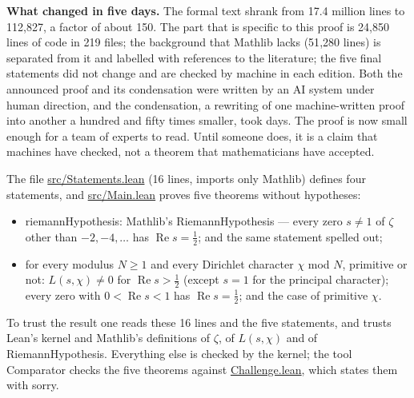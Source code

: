 \documentclass[11pt,a4paper]{article}
\newcommand{\code}[1]{{\ttfamily\small\color{lean}#1}}
\newcommand{\lk}[2]{\href{#1}{\code{#2}}}
\newcommand{\B}{https://github.com/lsernau/grh-lean/blob/72fead102f663d5c7a407964a13dc0cf9d977207/grh-compact/}
\newcommand{\head}[1]{\par\addvspace{11pt}\Needspace{6\baselineskip}\noindent{\large\bfseries\color{ink}#1}\par\nopagebreak\vspace{2pt}}
\begin{document}
\textbf{What changed in five days.} The formal text shrank from 17.4 million lines to 112{,}827, a factor of about 150.
The part that is specific to this proof is 24{,}850 lines of code in 219 files; the background that Mathlib lacks
(51{,}280 lines) is separated from it and labelled with references to the literature; the five final statements did
not change and are checked by machine in each edition. Both the announced proof and its condensation were written by
an AI system under human direction, and the condensation, a rewriting of one machine-written proof into another a
hundred and fifty times smaller, took days. The proof is now small enough for a team of experts to read. Until
someone does, it is a claim that machines have checked, not a theorem that mathematicians have accepted.

\head{3. The theorems and the trust base}
The file \lk{\B src/Statements.lean}{src/Statements.lean} (16 lines, imports only Mathlib) defines four statements, and \lk{\B src/Main.lean}{src/Main.lean}
proves five theorems without hypotheses:
\begin{itemize}
\item \code{riemannHypothesis}: Mathlib's \code{RiemannHypothesis} --- every zero $s\ne1$ of $\zeta$ other than
$-2,-4,\dots$ has $\operatorname{Re}s=\tfrac12$; and the same statement spelled out;
\item for every modulus $N\ge1$ and every Dirichlet character $\chi$ mod $N$, primitive or not:
$L(s,\chi)\ne0$ for $\operatorname{Re}s>\tfrac12$ (except $s=1$ for the principal character); every zero with
$0<\operatorname{Re}s<1$ has $\operatorname{Re}s=\tfrac12$; and the case of primitive $\chi$.
\end{itemize}
To trust the result one reads these 16 lines and the five statements, and trusts Lean's kernel and Mathlib's
definitions of $\zeta$, of $L(s,\chi)$ and of \code{RiemannHypothesis}. Everything else is checked by the kernel; the
tool Comparator checks the five theorems against \lk{\B Challenge.lean}{Challenge.lean}, which states them with \code{sorry}.
\end{document}
